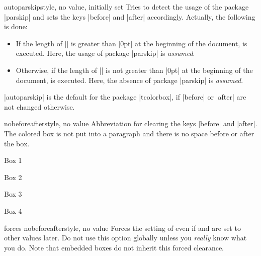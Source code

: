 \begin{docTcbKey}{autoparskip}{}{style, no value, initially set}
  Tries to detect the usage of the package |parskip| and sets
  the keys |before| and |after| accordingly. Actually, the following is done:
  \begin{itemize}
  \item If the length of |\parskip| is greater than |0pt| at the beginning of the document,
     is executed. Here, the usage of package |parskip| is \emph{assumed}.
  \item Otherwise, if the length of |\parskip| is not greater than |0pt| at the beginning of the document,
     is executed. Here, the absence of package |parskip| is \emph{assumed}.
  \end{itemize}
  |autoparskip| is the default for the package |tcolorbox|, if |before| or |after|
  are not changed otherwise.
\end{docTcbKey}

\begin{docTcbKey}{nobeforeafter}{}{style, no value}
  Abbreviation for clearing the keys |before| and |after|. The colored box
  is not put into a paragraph and there is no space before or after the box.
\begin{dispExample}
\begin{tcolorbox}[myone,title=Box 1]Box 1\end{tcolorbox}%
\begin{tcolorbox}[myone,title=Box 2]Box 2\end{tcolorbox}%
\begin{tcolorbox}[myone,title=Box 3]Box 3\end{tcolorbox}%
\begin{tcolorbox}[myone,title=Box 4]Box 4\end{tcolorbox}
\end{dispExample}
\end{docTcbKey}

\enlargethispage*{1cm}
\begin{docTcbKey}{forces nobeforeafter}{}{style, no value}
  Forces the setting of  even if
   and  are set to other values
  later. Do not use this option globally unless you \emph{really} know what you do.
  Note that embedded boxes do not inherit this forced clearance.
\end{docTcbKey}


